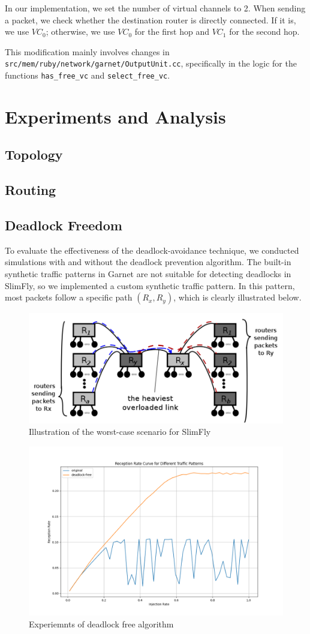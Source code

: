 \documentclass[utf8]{article}
\begin{document}
In our implementation, we set the number of virtual channels to 2. When sending a packet, we check whether the destination router is directly connected. If it is, we use \(VC_0\); otherwise, we use \(VC_0\) for the first hop and \(VC_1\) for the second hop.

This modification mainly involves changes in \texttt{src/mem/ruby/network/garnet/OutputUnit.cc}, specifically in the logic for the functions \texttt{has\_free\_vc} and \texttt{select\_free\_vc}.

\section{Experiments and Analysis}

\subsection{Topology}

\subsection{Routing}

\subsection{Deadlock Freedom}

To evaluate the effectiveness of the deadlock-avoidance technique, we conducted simulations with and without the deadlock prevention algorithm. The built-in synthetic traffic patterns in Garnet are not suitable for detecting deadlocks in SlimFly, so we implemented a custom synthetic traffic pattern. In this pattern, most packets follow a specific path \((R_x, R_y)\), which is clearly illustrated below.

\begin{figure}[h]
    \centering
    \includegraphics[width=0.5\linewidth]{WorstCase.png}
    \caption{Illustration of the worst-case scenario for SlimFly}
\end{figure}

\begin{figure}[h]
    \centering
    \includegraphics[width=0.5\linewidth]{deadlock.png}
    \caption{Experiemnts of deadlock free algorithm}
\end{figure}
\end{document}
